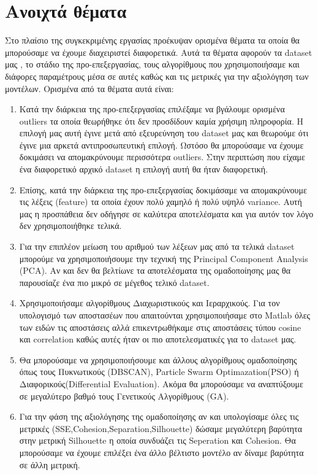 \chapter{Ανοιχτά θέματα}
Στο πλαίσιο της συγκεκριμένης εργασίας προέκυψαν ορισμένα θέματα τα οποία θα μπορούσαμε να έχουμε διαχειριστεί διαφορετικά. Αυτά τα θέματα αφορούν τα dataset μας , το στάδιο της προ-επεξεργασίας, τους αλγορίθμους που χρησιμοποιήσαμε και διάφορες παραμέτρους μέσα σε αυτές καθώς και τις μετρικές για την αξιολόγηση των μοντέλων. Ορισμένα από τα θέματα αυτά είναι:

\begin{enumerate}
	\item Κατά την διάρκεια της προ-επεξεργασίας επιλέξαμε να βγάλουμε ορισμένα outliers τα οποία θεωρήθηκε ότι δεν προσδίδουν καμία χρήσιμη πληροφορία. Η επιλογή μας αυτή έγινε μετά από εξευρεύνηση του dataset μας και θεωρούμε ότι έγινε μια αρκετά αντιπροσωπευτική επιλογή. Ωστόσο θα μπορούσαμε να έχουμε δοκιμάσει να απομακρύνουμε περισσότερα outliers. Στην περιπτώση που είχαμε ένα διαφορετικό αρχικό dataset η επιλογή αυτή θα ήταν διαφορετική.
	\item Επίσης, κατά την διάρκεια της προ-επεξεργασίας δοκιμάσαμε να απομακρύνουμε τις λέξεις (feature) τα οποία έχουν πολύ χαμηλό ή πολύ υψηλό variance. Αυτή μας η προσπάθεια δεν οδήγησε σε καλύτερα αποτελέσματα και για αυτόν τον λόγο δεν χρησιμοποιήθηκε τελικά.
	\item Για την επιπλέον μείωση του αριθμού των λέξεων μας από τα τελικά dataset μπορούμε να χρησιμοποιήσουμε την τεχνική της Principal Component Analysis (PCA). Αν και δεν θα βελτίωνε τα αποτελέσματα της ομαδοποίησης μας θα παρουσίαζε ένα πιο μικρό σε μέγεθος τελικό dataset.
	\item Χρησιμοποιήσαμε αλγορίθμους Διαχωριστικούς και Ιεραρχικούς. Για τον υπολογισμό των αποστασέων που απαιτούνται χρησιμοποιήσαμε στο Matlab όλες των ειδών τις αποστάσεις αλλά επικεντρωθήκαμε στις αποστάσεις τύπου cosine και correlation καθώς αυτές ήταν οι πιο αποτελεσματικές για το dataset μας.
	\item Θα μπορούσαμε να χρησιμοποιήσουμε και άλλους αλγορίθμους ομαδοποίησης όπως τους Πυκνωτικούς (DBSCAN), Particle Swarm Optimazation(PSO) ή Διαφορικούς(Differential Evaluation). Ακόμα θα μπορούσαμε να αναπτύξουμε σε μεγαλύτερο βαθμό τους Γενετικούς Αλγορίθμους (GA).
	\item Για την φάση της αξιολόγησης της ομαδοποίησης αν και υπολογίσαμε όλες τις μετρικές (SSE,Cohesion,Separation,Silhouette) δώσαμε μεγαλύτερη βαρύτητα στην μετρική Silhouette η οποία συνδυάζει τις Seperation και Cohesion. Θα μπορούσαμε να έχουμε επιλέξει ένα άλλο βέλτιστο μοντέλο αν δίναμε βαρύτητα σε άλλη μετρική.

\end{enumerate}
